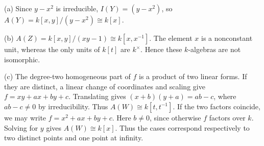 (a) Since $y-x^2$ is irreducible, $I(Y)=(y-x^2)$, so $A(Y)=k[x,y]/(y-x^2)\cong k[x]$.

(b) $A(Z)=k[x,y]/(xy-1)\cong k[x,x^{-1}]$. The element $x$ is a nonconstant unit, whereas the only units of $k[t]$ are $k^\times$. Hence these $k$-algebras are not isomorphic.

(c) The degree-two homogeneous part of $f$ is a product of two linear forms. If they are distinct, a linear change of coordinates and scaling give $f=xy+ax+by+c$. Translating gives $(x+b)(y+a)=ab-c$, where $ab-c\ne0$ by irreducibility. Thus $A(W)\cong k[t,t^{-1}]$. If the two factors coincide, we may write $f=x^2+ax+by+c$. Here $b\ne0$, since otherwise $f$ factors over $k$. Solving for $y$ gives $A(W)\cong k[x]$. Thus the cases correspond respectively to two distinct points and one point at infinity.
